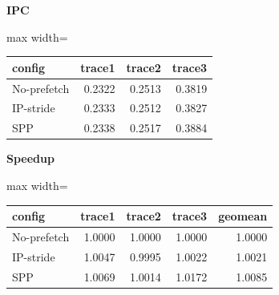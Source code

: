 \documentclass[10pt]{article}
\begin{document}
\begin{center}
\begin{minipage}[t]{0.48\linewidth}\centering
\textbf{IPC}\\[3pt]
\begin{adjustbox}{max width=\linewidth}
\begin{tabular}{@{}lrrr@{}}
\toprule
\textbf{config} & \textbf{trace1} & \textbf{trace2} & \textbf{trace3} \\
\midrule
No-prefetch & 0.2322 & 0.2513 & 0.3819 \\
IP-stride & 0.2333 & 0.2512 & 0.3827 \\
SPP & 0.2338 & 0.2517 & 0.3884 \\
\bottomrule
\end{tabular}
\end{adjustbox}
\end{minipage}\hfill
\begin{minipage}[t]{0.48\linewidth}\centering
\textbf{Speedup}\\[3pt]
\begin{adjustbox}{max width=\linewidth}
\begin{tabular}{@{}lrrrr@{}}
\toprule
\textbf{config} & \textbf{trace1} & \textbf{trace2} & \textbf{trace3} & \textbf{geomean} \\
\midrule
No-prefetch & 1.0000 & 1.0000 & 1.0000 & 1.0000 \\
IP-stride & 1.0047 & 0.9995 & 1.0022 & 1.0021 \\
SPP & 1.0069 & 1.0014 & 1.0172 & 1.0085 \\
\bottomrule
\end{tabular}
\end{adjustbox}
\end{minipage}
\end{center}
\medskip
\end{document}
